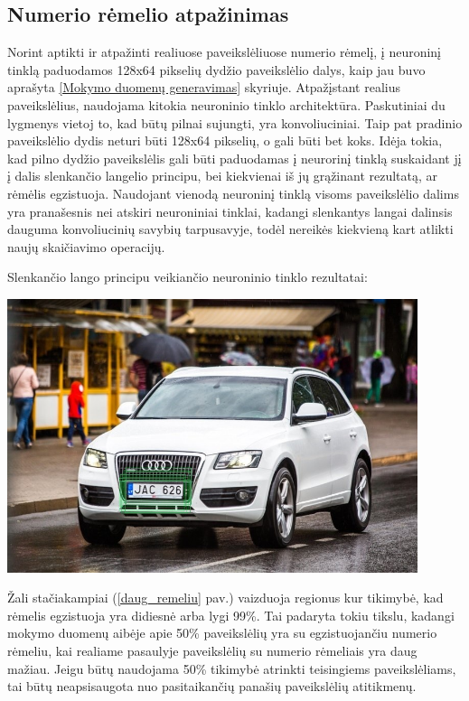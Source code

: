 \documentclass{VUMIFInfBakalaurinis}
\begin{document}
\subsection{Numerio rėmelio atpažinimas}
Norint aptikti ir atpažinti realiuose paveikslėliuose numerio rėmelį, į neuroninį tinklą paduodamos 128x64 pikselių dydžio
paveikslėlio dalys, kaip jau buvo aprašyta \ref{Mokymo duomenų generavimas} skyriuje.
Atpažįstant realius paveikslėlius, naudojama kitokia neuroninio tinklo architektūra. Paskutiniai du lygmenys vietoj to, 
kad būtų pilnai sujungti, yra konvoliuciniai. Taip pat pradinio paveikslėlio dydis neturi būti 128x64 pikselių, o gali būti
bet koks. Idėja tokia, kad pilno dydžio paveikslėlis gali būti paduodamas į neurorinį tinklą suskaidant jį į dalis slenkančio
langelio principu, bei kiekvienai iš jų grąžinant rezultatą, ar rėmėlis egzistuoja. Naudojant vienodą neuroninį tinklą visoms 
paveikslėlio dalims yra pranašesnis nei atskiri neuroniniai tinklai, kadangi slenkantys langai dalinsis dauguma konvoliucinių 
savybių tarpusavyje, todėl nereikės kiekvieną kart atlikti naujų skaičiavimo operacijų.

Slenkančio lango principu veikiančio neuroninio tinklo rezultatai:

\begin{minipage}{\linewidth}
  \centering
  \includegraphics[width=12cm]{sliding.jpg}
  \label{daug_remeliu}
\end{minipage}

Žali stačiakampiai (\ref{daug_remeliu} pav.) vaizduoja regionus kur tikimybė, kad rėmelis egzistuoja yra didiesnė arba lygi 99\%.
Tai padaryta tokiu tikslu, kadangi mokymo duomenų aibėje apie 50\% paveikslėlių yra su egzistuojančiu numerio rėmeliu,
kai realiame pasaulyje paveikslėlių su numerio rėmeliais yra daug mažiau. Jeigu būtų naudojama 50\% tikimybė atrinkti 
teisingiems paveikslėliams, tai būtų neapsisaugota nuo pasitaikančių panašių paveikslėlių atitikmenų.
\end{document}
